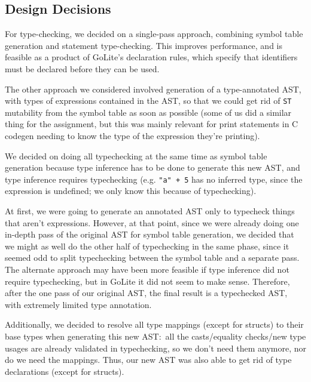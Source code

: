 \documentclass[11pt]{article}
\begin{document}
\subsection{Design Decisions}
For type-checking, we decided on a single-pass approach, combining
symbol table generation and statement type-checking. This improves
performance, and is feasible as a product of GoLite's declaration
rules, which specify that identifiers must be declared before they can
be used.

The other approach we considered involved generation of a
type-annotated AST, with types of expressions contained in the AST, so
that we could get rid of \texttt{ST} mutability from the symbol table
as soon as possible (some of us did a similar thing for the
assignment, but this was mainly relevant for print statements in C
codegen needing to know the type of the expression they're printing).

We decided on doing all typechecking at the same time as symbol table
generation because type inference has to be done to generate this new
AST, and type inference requires typechecking (e.g. \texttt{"a" + 5}
has no inferred type, since the expression is undefined; we only know
this because of typechecking).

At first, we were going to generate an annotated AST only to typecheck
things that aren't expressions. However, at that point, since we were
already doing one in-depth pass of the original AST for symbol table
generation, we decided that we might as well do the other half of
typechecking in the same phase, since it seemed odd to split
typechecking between the symbol table and a separate pass. The
alternate approach may have been more feasible if type inference did
not require typechecking, but in GoLite it did not seem to make
sense. Therefore, after the one pass of our original AST, the final
result is a typechecked AST, with extremely limited type annotation.

Additionally, we decided to resolve all type mappings (except for
structs) to their base types when generating this new AST:~all the
casts/equality checks/new type usages are already validated in
typechecking, so we don't need them anymore, nor do we need the
mappings. Thus, our new AST was also able to get rid of type
declarations (except for structs).
\end{document}

